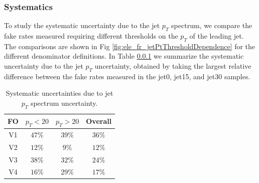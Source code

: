 \subsubsection{Systematics}
To study the systematic uncertainty due to the jet $p_{T}$ spectrum, we compare the fake rates
measured requiring different thresholds on the $p_{T}$ of the leading jet. The comparisons
are shown in Fig \ref{fig:ele_fr_jetPtThresholdDependence} for the different denominator definitions. 
In Table \ref{} we summarize the systematic uncertainty due to the jet $p_{T}$ uncertainty, 
obtained by taking the largest relative difference between the fake rates measured in the 
jet0, jet15, and jet30 samples.

\begin{table}[!htbp]
\begin{center}
\begin{tabular}{|c|cc|c|}
\hline
FO & $p_T<20$ & $p_T>20$ & Overall \\
\hline 
V1 & $47\%$ & $39\%$ & $36\%$ \\
V2 & $12\%$ & $9\%$ & $12\%$ \\
V3 & $38\%$ & $32\%$ & $24\%$ \\
V4 & $16\%$ & $29\%$ & $17\%$ \\
\hline
\end{tabular}
\caption{Systematic uncertainties due to jet $p_{T}$ spectrum uncertainty.}
\label{tab:ele_fr_ptThreshold_dep}
\end{center}
\end{table}


